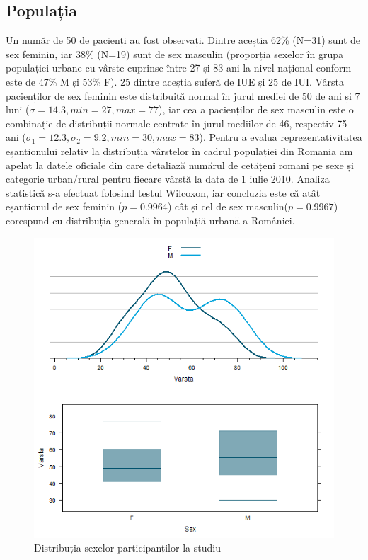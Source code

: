 \documentclass[12pt,draft]{article}
\begin{document}
\subsection{Populația}
 \label{rezPop}
  Un număr de 50 de pacienți au fost observați. Dintre aceștia 62\% (N=31) sunt de sex feminin, iar 38\% (N=19) sunt de sex masculin (proporția sexelor în grupa populației urbane cu vârste cuprinse între 27 și 83 ani la nivel național conform \citep{insee2011} este de 47\% M și 53\% F). 25 dintre aceștia suferă de \ac{IUE} și 25 de \ac{IUI}.
  Vârsta pacienților de sex feminin este distribuită normal în jurul mediei de 50 de ani și 7 luni ($\sigma=14.3,min=27,max=77$), iar cea a pacienților de sex masculin este o combinație de distribuții normale centrate în jurul mediilor de 46,  respectiv 75 ani ($\sigma_{1}=12.3 , \sigma_{2}=9.2,min=30,max=83$).
  Pentru a evalua reprezentativitatea eșantionului relativ la distribuția vârstelor în cadrul populației din Romania am apelat la datele oficiale din \citep{insee2011} care detaliază numărul de cetățeni romani pe sexe și categorie urban/rural pentru fiecare vârstă la data de 1 iulie 2010. 
  Analiza statistică s-a efectuat folosind testul Wilcoxon, iar concluzia este că atât eșantionul de sex feminin ($p=0.9964$) cât și cel de sex masculin($p=0.9967$) corespund cu distribuția generală în populațiă urbană a României.
  \begin{figure}[H]
   \centering
   \includegraphics[width=0.8\linewidth]{incoVarstaSex}
   \caption{Distribuția sexelor participanților la studiu}
   \label{fig:Distributia sexelor participantilor la studiu}
  \end{figure}
\end{document}
